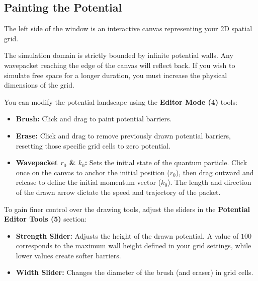 \documentclass[11pt, a4paper]{article}
\begin{document}
\subsection{Painting the Potential}
The left side of the window is an interactive canvas representing your 2D spatial grid.

\begin{Note}
The simulation domain is strictly bounded by infinite potential walls. Any wavepacket reaching the edge of the canvas will reflect back. If you wish to simulate free space for a longer duration, you must increase the physical dimensions of the grid.
\end{Note}

You can modify the potential landscape using the \textbf{Editor Mode (4)} tools:
\begin{itemize}
    \item \textbf{Brush:} Click and drag to paint potential barriers.
    \item \textbf{Erase:} Click and drag to remove previously drawn potential barriers, resetting those specific grid cells to zero potential.
    \item \textbf{Wavepacket $r_0$ \& $k_0$:} Sets the initial state of the quantum particle. Click once on the canvas to anchor the initial position ($r_0$), then drag outward and release to define the initial momentum vector ($k_0$). The length and direction of the drawn arrow dictate the speed and trajectory of the packet.
\end{itemize}

To gain finer control over the drawing tools, adjust the sliders in the \textbf{Potential Editor Tools (5)} section:
\begin{itemize}
    \item \textbf{Strength Slider:} Adjusts the height of the drawn potential. A value of $100$ corresponds to the maximum wall height defined in your grid settings, while lower values create softer barriers.
    \item \textbf{Width Slider:} Changes the diameter of the brush (and eraser) in grid cells.
\end{itemize}
\end{document}
